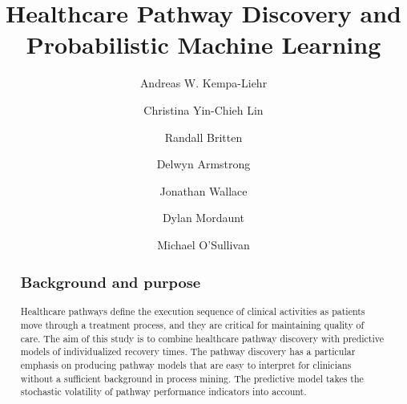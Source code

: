 \documentclass{elsarticle}
\newcommand{\wordcount}[2]{%
  (\immediate\write18{texcount -1 -sum -merge #1.tex > #1-words.sum }%
  /#2 words)%
}
\begin{document}
\newcommand{\plugin}[1]{\texttt{#1}}
\begin{frontmatter}

  \title{Healthcare Pathway Discovery and Probabilistic Machine
    Learning}


\author[mymainaddress]{Andreas W. Kempa-Liehr}
\author[mymainaddress]{Christina Yin-Chieh Lin}
\author[ADHB,Orion]{Randall Britten}
\author[Waitemata]{Delwyn Armstrong}
\author[Waitemata]{Jonathan Wallace}
\author[Adelaide,wasWaitemata]{Dylan Mordaunt}
\author[mymainaddress]{Michael O'Sullivan}

\address[mymainaddress]{Department of Engineering Science, The University of Auckland, 70 Symonds St, Auckland, New Zealand}
\address[ADHB]{Auckland District Health Board, 2 Park Road, Auckland, New Zealand}
\address[Orion]{was at Orion Health, 181 Grafton Rd, Auckland, New Zealand}

\address[Waitemata]{Waitemata District Health Board, 124 Shakespeare Rd, Auckland, New Zealand
}
\address[Adelaide]{University of Adelaide and Flinders University, Adelaide, Australia}
\address[wasWaitemata]{was at Waitemata District Health Board, 124 Shakespeare Rd, Auckland, New Zealand
}

\begin{abstract}
\subsection*{Background and purpose}
Healthcare pathways define the execution sequence of clinical
activities as patients move through a treatment process, and they are
critical for maintaining quality of care. The aim of this study is to
combine healthcare pathway discovery with predictive models of
individualized recovery times.
The pathway discovery has a particular emphasis on producing pathway
models that are easy to interpret for clinicians without a sufficient
background in process mining. The predictive model takes the
stochastic volatility of pathway performance indicators into account. 


\end{abstract}
\end{frontmatter}
\end{document}
